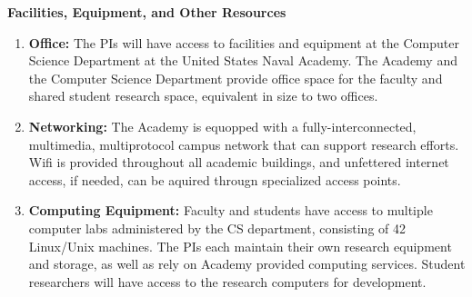 \documentclass[10pt]{article}
\begin{document}
\begin{center}
{\Large \bf Facilities, Equipment, and Other Resources} \\
\end{center}

\begin{enumerate}

\item {\bf Office:} The PIs will have access to facilities and
  equipment at the Computer Science Department at the United States Naval
   Academy. The Academy and the Computer Science Department provide office
   space for the faculty and shared student research space, equivalent in size
   to two offices.

\item {\bf Networking:} The Academy is equopped with a
  fully-interconnected, multimedia, multiprotocol campus network that
  can support research efforts. Wifi is provided throughout all
  academic buildings, and unfettered internet access, if needed, can
  be aquired througn specialized access points.

\item {\bf Computing Equipment:} Faculty and students have access to
  multiple computer labs administered by the CS department, consisting
  of 42 Linux/Unix machines. The PIs each maintain their own research
  equipment and storage, as well as rely on Academy provided computing
  services. Student researchers will have access to the
  research computers for development.

\end{enumerate}
\end{document}
